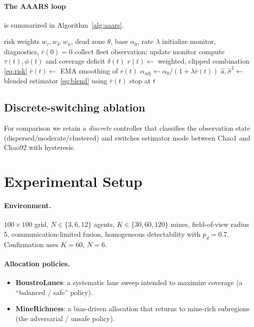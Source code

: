 \documentclass[11pt]{article}
\newcommand{\Khat}{\hat{K}}
\begin{document}
\paragraph{The AAARS loop} is summarized in Algorithm~\ref{alg:aaars}.

\begin{algorithm}[t]
\caption{AAARS online stopping loop}
\label{alg:aaars}
\begin{algorithmic}[1]
\Require risk weights $w_\tau,w_\delta,w_\phi$, dead zone $\theta$, base $\alpha_0$, rate $\lambda$
\State initialize monitor, diagnostics, $\bar r(0)=0$
  \State collect fleet observation; update monitor
  \State compute $\tau(t),\phi(t)$ and coverage deficit $\delta(t)$
  \State $r(t)\gets$ weighted, clipped combination \eqref{eq:risk}
  \State $\bar r(t)\gets$ EMA smoothing of $r(t)$
  \State $\alpha_{\mathrm{adj}}\gets \alpha_0/(1+\lambda \bar r(t))$ 
  \State $\hat a,\hat\sigma^2\gets$ blended estimator \eqref{eq:blend} using $\bar r(t)$
  \If{armed \textbf{and} $U_{\mathrm{upper}} \le \alpha_{\mathrm{adj}}\Khat$}
    \State \Return stop at $t$
  \EndIf
\EndFor
\end{algorithmic}
\end{algorithm}

\subsection{Discrete-switching ablation}
For comparison we retain a \emph{discrete} controller that classifies the observation state
(dispersed/moderate/clustered) and switches estimator mode between Chao1 and Chao92 with hysteresis.

\section{Experimental Setup}
\label{sec:setup}

\paragraph{Environment.}
$100\times100$ grid, $N\in\{3,6,12\}$ agents, $K\in\{30,60,120\}$ mines, field-of-view radius 5,
communication-limited fusion, homogeneous detectability with $p_d=0.7$. Confirmation uses
$K{=}60$, $N{=}6$.

\paragraph{Allocation policies.}
\begin{itemize}
\item \textbf{BoustroLanes}: a systematic lane sweep intended to maximize coverage (a ``balanced /
safe'' policy).
\item \textbf{MineRichness}: a bias-driven allocation that returns to mine-rich subregions (the
adversarial / unsafe policy).
\end{itemize}
\end{document}
